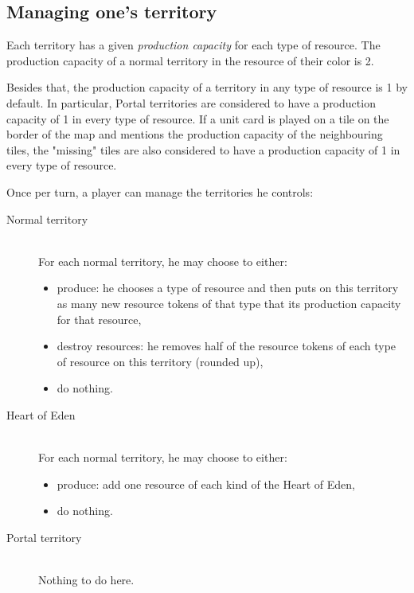 \documentclass[a4paper]{article}
\begin{document}
\newpage
  \subsection{Managing one's territory}
  
    Each territory has a given \textit{production capacity} for each type of resource.
    The production capacity of a normal territory in the resource of their color is 2.
    
    Besides that, the production capacity of a territory in any type of resource is 1 by default.
    In particular, Portal territories are considered to have a production capacity of 1 in every
    type of resource.
    If a unit card is played on a tile on the border of the map and mentions the production
    capacity of the neighbouring tiles, the "missing" tiles are also considered to have a
    production capacity of 1 in every type of resource.
    
    \hspace{-1.5em}Once per turn, a player can manage the territories he controls:
    \vspace{-1.3em}
    \begin{description}
        \item[Normal territory] \hfill \\
        	For each normal territory, he may choose to either:
            \vspace{-0.7em}
            \begin{itemize}
        		\item produce: he chooses a type of resource and then puts
            	on this territory as many new resource tokens of that type that its production
            	capacity for that resource,
        		\item destroy resources: he removes half of the resource
            tokens of each type of resource on this territory (rounded up),
        		\item do nothing.
    		\end{itemize}
        \item[Heart of Eden] \hfill \\
        	For each normal territory, he may choose to either:
            \vspace{-0.7em}
            \begin{itemize}
        		\item produce: add one resource of each kind of the Heart of Eden,
        		\item do nothing.
    		\end{itemize}
        \item[Portal territory] \hfill \\
        	Nothing to do here.
    \end{description}
\end{document}
